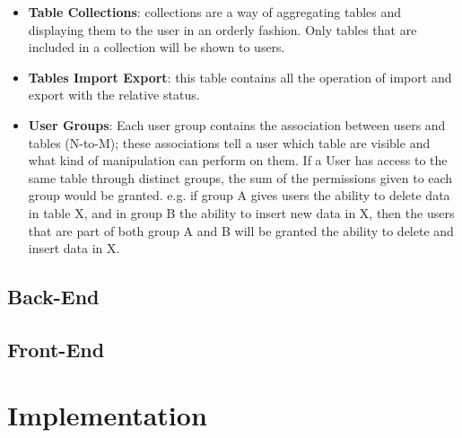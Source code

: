 \begin{itemize}
    \item \textbf{Table Collections}: collections are a way of aggregating tables and displaying them to the user in an orderly fashion. Only tables that are included in a collection will be shown to users.
    
    \item \textbf{Tables Import Export}: this table contains all the operation of import and export with the relative status.
    
    \item \textbf{User Groups}: Each user group contains the association between users and tables (N-to-M); these associations tell a user which table are visible and what kind of manipulation can perform on them. If a User has access to the same table through distinct groups, the sum of the permissions given to each group would be granted. e.g. if group A gives users the ability to delete data in table X, and in group B the ability to insert new data in X, then the users that are part of both group A and B will be granted the ability to delete and insert data in X.
    
\end{itemize}

\subsection{Back-End}

\subsection{Front-End}

\section{Implementation}
